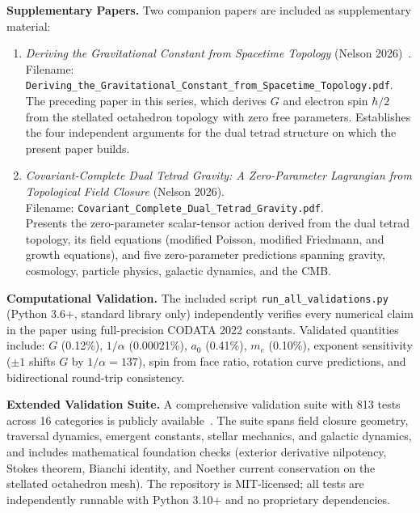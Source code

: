 \documentclass[aps,prd,preprint,superscriptaddress,showpacs,preprintnumbers,amsmath,amssymb,nofootinbib]{revtex4-2}
\begin{document}
\textbf{Supplementary Papers.}\quad
Two companion papers are included as supplementary material:
\begin{enumerate}[leftmargin=2em]
\item \textit{Deriving the Gravitational Constant from Spacetime Topology} (Nelson 2026)~\cite{paper6}.\\Filename: \texttt{Deriving\_the\_Gravitational\_Constant\_from\_Spacetime\_Topology.pdf}.\\The preceding paper in this series, which derives $G$ and electron spin $\hbar/2$ from the stellated octahedron topology with zero free parameters. Establishes the four independent arguments for the dual tetrad structure on which the present paper builds.

\item \textit{Covariant-Complete Dual Tetrad Gravity: A Zero-Parameter Lagrangian from Topological Field Closure} (Nelson 2026).\\Filename: \texttt{Covariant\_Complete\_Dual\_Tetrad\_Gravity.pdf}.\\Presents the zero-parameter scalar-tensor action derived from the dual tetrad topology, its field equations (modified Poisson, modified Friedmann, and growth equations), and five zero-parameter predictions spanning gravity, cosmology, particle physics, galactic dynamics, and the CMB.
\end{enumerate}

\textbf{Computational Validation.}\quad
The included script \texttt{run\_all\_validations.py} (Python 3.6+, standard library only) independently verifies every numerical claim in the paper using full-precision CODATA 2022 constants. Validated quantities include: $G$ (0.12\%), $1/\alpha$ (0.00021\%), $a_0$ (0.41\%), $m_e$ (0.10\%), exponent sensitivity ($\pm 1$ shifts $G$ by $1/\alpha = 137$), spin from face ratio, rotation curve predictions, and bidirectional round-trip consistency.

\textbf{Extended Validation Suite.}\quad
A comprehensive validation suite with 813 tests across 16 categories is publicly available~\cite{gfm-repo}. The suite spans field closure geometry, traversal dynamics, emergent constants, stellar mechanics, and galactic dynamics, and includes mathematical foundation checks (exterior derivative nilpotency, Stokes theorem, Bianchi identity, and Noether current conservation on the stellated octahedron mesh). The repository is MIT-licensed; all tests are independently runnable with Python 3.10+ and no proprietary dependencies.
\end{document}
